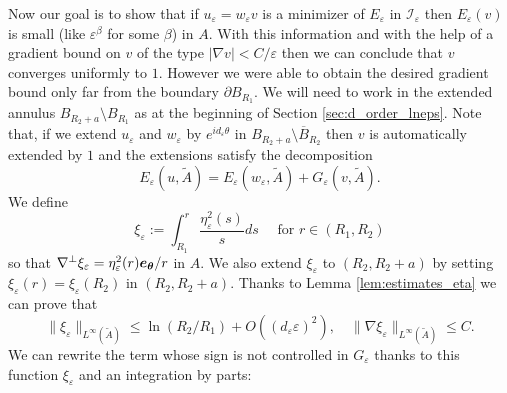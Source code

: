 \documentclass[12pt,reqno]{amsart}
\def\A{{\tilde{A}}}
\def\I{{\mathcal I}}
\def\e {{\varepsilon}}
\renewcommand{\vec}[1]{\text{\boldmath $#1$}}
\def \p {\partial}
\numberwithin{equation}{section}
\begin{document}
Now our goal is to show that if \(u_\e=w_\e v\) is  a minimizer of \(E_\e\) in \(\I_\e\) then \(E_\e(v)\) is small (like \(\e^\beta\) for some \(\beta\)) in \(A\). With this information and with the help of a gradient bound on \(v\) of the type \(|\nabla v|< C/\e\) then we can conclude that \(v\) converges uniformly to \(1\). However we were able to obtain the desired gradient bound only far from the boundary \(\p B_{R_1}\). We will need to work in the extended annulus \(B_{R_2+a}\setminus B_{R_1}\) as at the beginning of Section \ref{sec:d_order_lneps}. Note that, if we extend \(u_\e\) and \(w_\e\) by \(e^{id_\e \theta}\) in \(B_{R_2+a}\setminus \overline{B}_{R_2}\) then \(v\) is automatically extended by \(1\) and the extensions satisfy the decomposition 
\begin{equation*}
E_\e(u,\tilde{A})=E_\e(w_\e,\tilde{A})+G_\e(v,\tilde{A}).
\end{equation*}
We define 
\begin{equation}\label{def:xi}
\xi_\e:=\int_{R_1}^r \frac{\eta_\e^2(s)}{s} ds \quad \text{ for } r\in (R_1,R_2)
\end{equation}
so that \(\nabla^\perp \xi_\e=\eta_\e^2(r) \vec{e_\theta}/r\) in \(A\). We also extend \(\xi_\e\) to \((R_2,R_2+a)\) by setting \(\xi_\e(r)=\xi_\e(R_2)\) in  \((R_2,R_2+a)\). Thanks to Lemma \ref{lem:estimates_eta} we can prove that 
\begin{equation}\label{eq:prop_xi}
\|\xi_\e\|_{L^\infty(\A)}\leq \ln (R_2/R_1)+O((d_\e\e)^2), \quad \|\nabla \xi_\e\|_{L^\infty(\tilde{A})}\leq C. 
\end{equation}
We can rewrite the term whose sign is not controlled in \(G_\e\) thanks to this function \(\xi_\e\) and an integration by parts:
\end{document}
